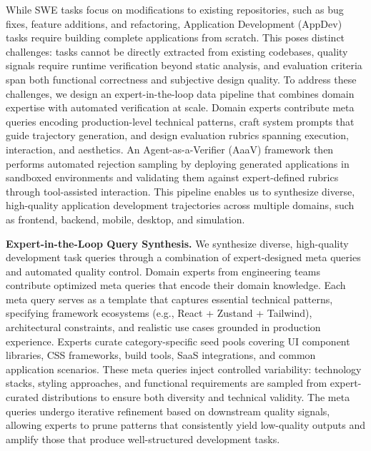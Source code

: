While SWE tasks focus on modifications to existing repositories, such as bug fixes, feature additions, and refactoring, Application Development (AppDev) tasks require building complete applications from scratch. This poses distinct challenges: tasks cannot be directly extracted from existing codebases, quality signals require runtime verification beyond static analysis, and evaluation criteria span both functional correctness and subjective design quality. To address these challenges, we design an expert-in-the-loop data pipeline that combines domain expertise with automated verification at scale. Domain experts contribute meta queries encoding production-level technical patterns, craft system prompts that guide trajectory generation, and design evaluation rubrics spanning execution, interaction, and aesthetics. An Agent-as-a-Verifier (AaaV) framework then performs automated rejection sampling by deploying generated applications in sandboxed environments and validating them against expert-defined rubrics through tool-assisted interaction. This pipeline enables us to synthesize diverse, high-quality application development trajectories across multiple domains, such as frontend, backend, mobile, desktop, and simulation.

\noindent \textbf{Expert-in-the-Loop Query Synthesis.} We synthesize diverse, high-quality development task queries through a combination of expert-designed meta queries and automated quality control. Domain experts from engineering teams contribute optimized meta queries that encode their domain knowledge. Each meta query serves as a template that captures essential technical patterns, specifying framework ecosystems (e.g., React + Zustand + Tailwind), architectural constraints, and realistic use cases grounded in production experience. Experts curate category-specific seed pools covering UI component libraries, CSS frameworks, build tools, SaaS integrations, and common application scenarios. These meta queries inject controlled variability: technology stacks, styling approaches, and functional requirements are sampled from expert-curated distributions to ensure both diversity and technical validity. The meta queries undergo iterative refinement based on downstream quality signals, allowing experts to prune patterns that consistently yield low-quality outputs and amplify those that produce well-structured development tasks.

